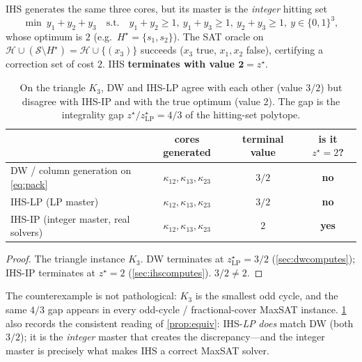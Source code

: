 IHS generates the same three cores, but its master is the \emph{integer} hitting
set
\[
\min\ y_1+y_2+y_3 \quad\text{s.t.}\quad y_1+y_2\ge1,\ y_1+y_3\ge1,\ y_2+y_3\ge1,\ y\in\{0,1\}^3,
\]
whose optimum is $2$ (e.g.\ $H^\star=\{s_1,s_2\}$). The SAT oracle on
$\mathcal{H}\cup(\mathcal{S}\setminus H^\star)=\mathcal{H}\cup\{(x_3)\}$ succeeds
($x_3$ true, $x_1,x_2$ false), certifying a correction set of cost $2$. IHS
\textbf{terminates with value $\boldsymbol{2} = z^\star$}.

\begin{table}[htbp]
\centering
\small
\begin{tabular}{l c c c}
\toprule
& cores generated & terminal value & is it $z^\star=2$? \\
\midrule
DW / column generation on \eqref{eq:pack} & $\kappa_{12},\kappa_{13},\kappa_{23}$ & $3/2$ & \textbf{no} \\
IHS-LP (LP master) & $\kappa_{12},\kappa_{13},\kappa_{23}$ & $3/2$ & \textbf{no} \\
IHS-IP (integer master, real solvers) & $\kappa_{12},\kappa_{13},\kappa_{23}$ & $2$ & \textbf{yes} \\
\bottomrule
\end{tabular}
\caption{On the triangle $K_3$, DW and IHS-LP agree with each other (value
$3/2$) but disagree with IHS-IP and with the true optimum (value $2$). The gap
is the integrality gap $z^\star/z^\star_{\mathrm{LP}} = 4/3$ of the hitting-set
polytope.}
\label{tab:counter}
\end{table}


\begin{proof}
The triangle instance $K_3$. DW terminates at $z^\star_{\mathrm{LP}} = 3/2$
(\cref{sec:dwcomputes}); IHS-IP terminates at $z^\star = 2$
(\cref{sec:ihscomputes}). $3/2 \ne 2$.
\end{proof}

The counterexample is not pathological: $K_3$ is the smallest odd cycle, and the
same $4/3$ gap appears in every odd-cycle / fractional-cover MaxSAT instance.
\cref{tab:counter} also records the consistent reading of
\cref{prop:equiv}: IHS-\emph{LP} \emph{does} match DW (both $3/2$);
it is the \emph{integer} master that creates the discrepancy---and the integer
master is precisely what makes IHS a correct MaxSAT solver.


